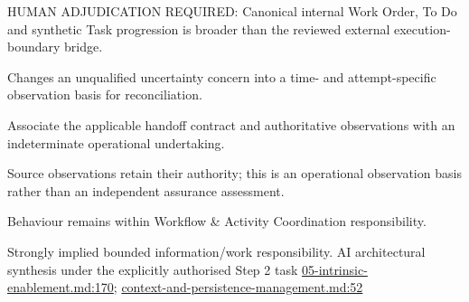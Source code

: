 HUMAN ADJUDICATION REQUIRED: Canonical internal Work Order, To Do and synthetic Task progression is broader than the reviewed external execution-boundary bridge.



Changes an unqualified uncertainty concern into a time- and attempt-specific observation basis for reconciliation.



Associate the applicable handoff contract and authoritative observations with an indeterminate operational undertaking.



Source observations retain their authority; this is an operational observation basis rather than an independent assurance assessment.



Behaviour remains within Workflow \& Activity Coordination responsibility.


Strongly implied bounded information/work responsibility. AI architectural synthesis under the explicitly authorised Step 2 task \hyperref[evidence:d70bf9b0b197558f]{05-intrinsic-enablement.md:170}; \hyperref[evidence:ea0c62dfd5edfd4a]{context-and-persistence-management.md:52}
